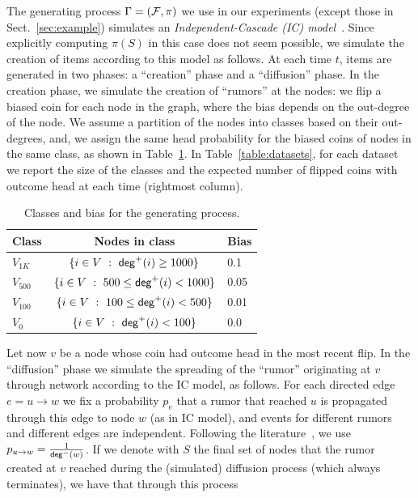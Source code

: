 The generating process $\Gamma=(\mathcal{F},\pi)$ we use in our experiments (except
those in Sect.~\ref{sec:example}) simulates an \emph{Independent-Cascade (IC)
model}~\citep{Kempe2003}. Since explicitly computing $\pi(S)$ in this case does
not seem possible, we simulate the creation of items according to this model as
follows. At each time $t$, items are generated in two phases: a ``creation''
phase and a ``diffusion'' phase. In the creation phase, we
simulate the creation of ``rumors'' at the nodes: we flip a biased coin
for each node in the graph, where the bias depends on the out-degree of the
node. We assume a partition of the nodes into classes based on their
out-degrees, and, we assign the same head probability for the biased coins of
nodes in the same class, as shown in Table~\ref{tab:bias}. In
Table~\ref{table:datasets}, for each dataset we report the size of the classes
and the expected number of flipped coins with outcome head at each time
(rightmost column).
\begin{table}[ht]
	\begin{tabular}{lcl}
		\toprule
		Class & Nodes in class & Bias\\
		\midrule
		$V_{1K}$ & $\{i\in V ~:~ \mathsf{deg}^+(i) \geq 1000\}$ & 0.1\\
		$V_{500}$ &  $\{i\in V ~:~ 500\leq \mathsf{deg}^+(i) < 1000\}$ & 0.05 \\
		$V_{100}$ & $\{i\in V ~:~ 100\leq \mathsf{deg}^+(i) < 500\}$  & 0.01 \\
		$V_{0}$   & $\{i\in V ~:~ \mathsf{deg}^+(i) < 100\}$ & 0.0\\
		\bottomrule
	\end{tabular}
	\caption{\scriptsize Classes and bias for the generating process.}
	\label{tab:bias}
\end{table}
Let now $v$ be a node whose coin had outcome head in the most recent flip. In
the ``diffusion'' phase we simulate the spreading of the ``rumor'' originating
at $v$ through network according to the IC model, as follows. For each directed
edge $e=u\rightarrow w$ we fix a probability $p_e$ that a rumor that reached $u$
is propagated through this edge to node $w$ (as in IC model), and events for
different rumors and different edges are independent. Following the
literature~\cite{Kempe2003,Chen2009,Chen2010,jung2011irie,tang2014influence}, we
use $p_{u\rightarrow w} = \frac{1}{\mathsf{deg}^-(w)}$. If we denote with $S$ the
final set of nodes that the rumor created at $v$ reached during the (simulated)
diffusion process (which always terminates), we have that through this process
